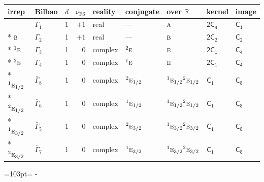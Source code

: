 \documentclass[10pt,a4paper]{article}
\makeatletter
\def\grouprule#1#2{\noalign{\marks\LTgroupmarks{\the\belowrulesep}\nobreak\vskip#1%
  \vskip\aboverulesep}\multispan\LT@cols\unskip{\leaders\hrule\@height#2\hfill\kern\z@}\cr
  \noalign{\penalty\LTrulebreak\vskip\belowrulesep\global\@lastruleclass\z@}}
\newcommand{\needspace}[1]{\par\penalty-100\begingroup\dimen0=#1\relax\dimen2=\pagegoal
  \advance\dimen2-\pagetotal\ifdim\dimen0>\dimen2\relax\ifdim\dimen2>0pt\vfil\break\fi\fi
  \endgroup}
\numberwithin{equation}{section}
\newcommand{\grp}[1]{\mathsf{#1}}
\newcommand{\irr}[1]{\text{\normalfont\scshape #1}}
\newcommand{\conjpair}[1]{{}^{#1}}
\newcommand{\detbox}[1]{{\setlength{\fboxsep}{1pt}\fbox{#1}}}
\newcommand{\fsind}{\nu_{\mathrm{FS}}}
\makeatother
\begin{document}
{\small\renewcommand{\arraystretch}{1.25}\setlength{\tabcolsep}{4pt}\begin{longtable}{@{}llrrlllll@{}}\toprule
irrep & Bilbao & $d$ & $\fsind$ & reality & conjugate & over $\mathbb{R}$ & kernel & image\\\midrule\endhead
\bottomrule\endfoot\endlastfoot
\detbox{$\irr{a}$} & $\Gamma_{1}$ & 1 & $+1$ & real & --- & $\irr{a}$ & \href{2C4.pdf}{$\grp{2C_{4}}$} & \href{../../../rotation/data/pdf/C1.pdf}{$\grp{C_{1}}$}\\*
$\irr{b}$ & $\Gamma_{2}$ & 1 & $+1$ & real & --- & $\irr{b}$ & \href{2C2.pdf}{$\grp{2C_{2}}$} & \href{../../../rotation/data/pdf/C2.pdf}{$\grp{C_{2}}$}\\*
$\conjpair{1}\irr{e}$ & $\Gamma_{3}$ & 1 & $0$ & complex & $\conjpair{2}\irr{e}$ & $\irr{e}$ & \href{2C1.pdf}{$\grp{2C_{1}}$} & \href{../../../rotation/data/pdf/C4.pdf}{$\grp{C_{4}}$}\\*
$\conjpair{2}\irr{e}$ & $\Gamma_{4}$ & 1 & $0$ & complex & $\conjpair{1}\irr{e}$ & $\irr{e}$ & \href{2C1.pdf}{$\grp{2C_{1}}$} & \href{../../../rotation/data/pdf/C4.pdf}{$\grp{C_{4}}$}\\*
\grouprule{0pt}{\lightrulewidth}
$\conjpair{1}\irr{e}_{1/2}$ & $\bar{\Gamma}_{8}$ & 1 & $0$ & complex & $\conjpair{2}\irr{e}_{1/2}$ & $\conjpair{1}\irr{e}_{1/2}\conjpair{2}\irr{e}_{1/2}$ & \href{C1.pdf}{$\grp{C_{1}}$} & \href{../../../rotation/data/pdf/C8.pdf}{$\grp{C_{8}}$}\\*
$\conjpair{2}\irr{e}_{1/2}$ & $\bar{\Gamma}_{6}$ & 1 & $0$ & complex & $\conjpair{1}\irr{e}_{1/2}$ & $\conjpair{1}\irr{e}_{1/2}\conjpair{2}\irr{e}_{1/2}$ & \href{C1.pdf}{$\grp{C_{1}}$} & \href{../../../rotation/data/pdf/C8.pdf}{$\grp{C_{8}}$}\\*
$\conjpair{1}\irr{e}_{3/2}$ & $\bar{\Gamma}_{5}$ & 1 & $0$ & complex & $\conjpair{2}\irr{e}_{3/2}$ & $\conjpair{1}\irr{e}_{3/2}\conjpair{2}\irr{e}_{3/2}$ & \href{C1.pdf}{$\grp{C_{1}}$} & \href{../../../rotation/data/pdf/C8.pdf}{$\grp{C_{8}}$}\\*
$\conjpair{2}\irr{e}_{3/2}$ & $\bar{\Gamma}_{7}$ & 1 & $0$ & complex & $\conjpair{1}\irr{e}_{3/2}$ & $\conjpair{1}\irr{e}_{3/2}\conjpair{2}\irr{e}_{3/2}$ & \href{C1.pdf}{$\grp{C_{1}}$} & \href{../../../rotation/data/pdf/C8.pdf}{$\grp{C_{8}}$}\\
\bottomrule\end{longtable}}
\needspace{103pt}
\end{document}
